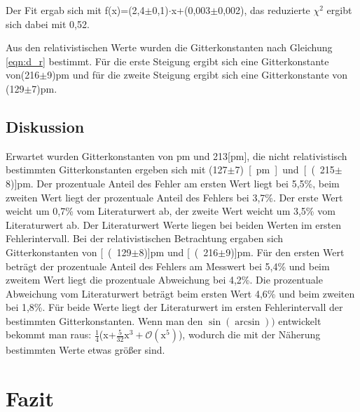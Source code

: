 \documentclass[12pt,a4paper]{article}
\begin{document}
Der Fit ergab sich mit f(x)=(2,4$\pm$0,1)$\cdot$x+(0,003$\pm$0,002), das reduzierte $\chi^2$ ergibt sich dabei mit 0,52.

Aus den relativistischen Werte wurden die Gitterkonstanten nach Gleichung \ref{eqn:d_r} bestimmt. Für die erste Steigung ergibt sich eine Gitterkonstante von(216$\pm$9)pm und für die zweite Steigung ergibt sich eine Gitterkonstante von (129$\pm$7)pm.

\subsection{Diskussion}

Erwartet wurden Gitterkonstanten von \unit[123]{pm} und \unit{213}[pm], die nicht relativistisch bestimmten Gitterkonstanten ergeben sich mit \unit{(127$\pm$7)}[pm] und \unit[(215$\pm$8)]{pm}. Der prozentuale Anteil des Fehler am ersten Wert liegt bei 5,5\%, beim zweiten Wert liegt der prozentuale Anteil des Fehlers bei 3,7\%.  Der erste Wert weicht um 0,7\% vom Literaturwert ab, der zweite Wert weicht um 3,5\% vom Literaturwert ab. Der Literaturwert Werte liegen bei beiden Werten im ersten Fehlerintervall.
Bei der relativistischen Betrachtung ergaben sich Gitterkonstanten von \unit[(129$\pm$8)]{pm} und \unit[(216$\pm$9)]{pm}. Für den ersten Wert beträgt der prozentuale Anteil des Fehlers am Messwert bei 5,4\% und beim zweitem Wert liegt die prozentuale Abweichung bei 4,2\%. Die prozentuale Abweichung vom Literaturwert beträgt beim ersten Wert 4,6\% und beim zweiten bei 1,8\%. Für beide Werte liegt der Literaturwert im ersten Fehlerintervall der bestimmten Gitterkonstanten. Wenn man den $\sin(\arcsin))$ entwickelt bekommt man raus: $\frac{1}{4}$(x+$\frac{5}{32} \text{x}^3 + \mathcal{O}(\text{x}^5) $), wodurch die mit der Näherung bestimmten Werte etwas größer sind.



\section{Fazit}
\end{document}
